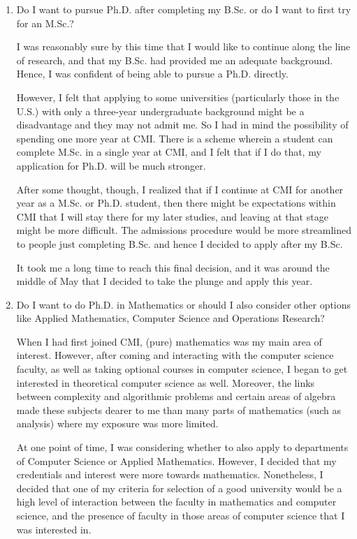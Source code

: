 \documentclass[a4paper]{amsart}
\begin{document}
\begin{enumerate}

\item Do I want to pursue Ph.D. after completing my B.Sc. or do I
  want to first try for an M.Sc.?

  I was reasonably sure by this time that I would like to continue
  along the line of research, and that my B.Sc. had provided me an
  adequate background. Hence, I was confident of being able to pursue
  a Ph.D. directly.

  However, I felt that applying to some universities (particularly
  those in the U.S.) with only a three-year undergraduate background
  might be a disadvantage and they may not admit me. So I had in mind
  the possibility of spending one more year at CMI. There is a scheme
  wherein a student can complete M.Sc. in a single year at CMI, and I
  felt that if I do that, my application for Ph.D. will be
  much stronger.

  After some thought, though, I realized that if I continue at CMI for
  another year as a M.Sc. or Ph.D. student, then there might be
  expectations within CMI that I will stay there for my later studies,
  and leaving at that stage might be more difficult. The admissions procedure
  would be more streamlined to people just completing B.Sc.
  and hence I decided to apply after my B.Sc.

  It took me a long time to reach this final decision, and it was
  around the middle of May that I decided to take the plunge and apply
  this year.

\item Do I want to do Ph.D. in Mathematics or should I also consider
  other options like Applied Mathematics, Computer Science and
  Operations Research?

  When I had first joined CMI, (pure) mathematics was my main area of
  interest.  However, after coming and interacting with the computer
  science faculty, as well as taking optional courses in computer
  science, I began to get interested in theoretical computer science
  as well.  Moreover, the links between complexity and algorithmic
  problems and certain areas of algebra made these subjects dearer to
  me than many parts of mathematics (such as analysis) where my exposure
  was more limited.

  At one point of time, I was considering whether to also apply to
  departments of Computer Science or Applied Mathematics. However, I
  decided that my credentials and interest were more towards
  mathematics. Nonetheless, I decided that one of my criteria for
  selection of a good university would be a high level of interaction
  between the faculty in mathematics and computer science, and the
  presence of faculty in those areas of computer science that I was
  interested in.


\end{enumerate}
\end{document}
